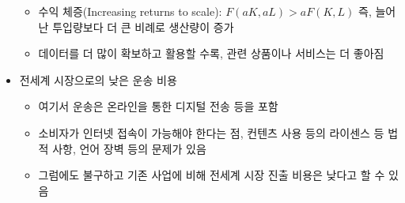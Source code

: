 \begin{itemize}
	\begin{itemize}
	\item 수익 체증(Increasing returns to scale):  $F(aK, aL) > a F(K, L)$ 즉, 늘어난 투입량보다 더 큰 비례로 생산량이 증가
	\item 데이터를 더 많이 확보하고 활용할 수록, 관련 상품이나 서비스는 더 좋아짐
	\end{itemize}
\item 전세계 시장으로의 낮은 운송 비용
	\begin{itemize}
	\item 여기서 운송은 온라인을 통한 디지털 전송 등을 포함
	\item 소비자가 인터넷 접속이 가능해야 한다는 점, 컨텐츠 사용 등의 라이센스 등 법적 사항, 언어 장벽 등의 문제가 있음
	\item 그럼에도 불구하고 기존 사업에 비해 전세계 시장 진출 비용은 낮다고 할 수 있음
	\end{itemize}
\end{itemize}

